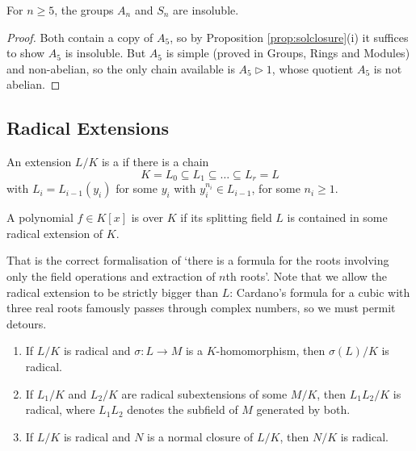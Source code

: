 \documentclass[a4paper]{scrartcl}
\begin{document}
\begin{corollary}\label{cor:sninsoluble}
	For $n \geq 5$, the groups $A_n$ and $S_n$ are insoluble.
\end{corollary}

\begin{proof}
	Both contain a copy of $A_5$, so by Proposition \ref{prop:solclosure}(i) it suffices to show $A_5$ is insoluble. But $A_5$ is simple (proved in Groups, Rings and Modules) and non-abelian, so the only chain available is $A_5 \rhd 1$, whose quotient $A_5$ is not abelian.
\end{proof}

\subsection{Radical Extensions}

\begin{definition}
	An extension $L/K$ is a  if there is a chain
	$$K = L_0 \subseteq L_1\subseteq\dots\subseteq L_r = L$$
	with $L_i = L_{i-1}(y_i)$ for some $y_i$ with $y_i^{n_i}\in L_{i-1}$, for some $n_i \geq 1$.
\end{definition}

\begin{definition}
	A polynomial $f \in K[x]$ is  over $K$ if its splitting field $L$ is contained in some radical extension of $K$.
\end{definition}

That is the correct formalisation of `there is a formula for the roots involving only the field operations and extraction of $n$th roots'. Note that we allow the radical extension to be strictly bigger than $L$: Cardano's formula for a cubic with three real roots famously passes through complex numbers, so we must permit detours.

\begin{lemma}\label{lem:radclosure}
	\begin{enumerate}[label=(\roman*)]
		\item If $L/K$ is radical and $\sigma : L \to M$ is a $K$-homomorphism, then $\sigma(L)/K$ is radical.
		\item If $L_1/K$ and $L_2/K$ are radical subextensions of some $M/K$, then $L_1L_2/K$ is radical, where $L_1L_2$ denotes the subfield of $M$ generated by both.
		\item If $L/K$ is radical and $N$ is a normal closure of $L/K$, then $N/K$ is radical.
	\end{enumerate}
\end{lemma}
\end{document}
